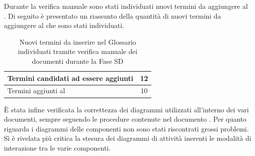 				Durante la verifica manuale sono stati individuati nuovi termini da aggiungere al . Di seguito è presentato un 
				riassunto della quantità di nuovi termini da aggiungere al  che sono stati individuati.
				\begin{table}[H]
					\centering
					\begin{tabu}{| l | c |}
						\hline
						Termini candidati ad essere aggiunti	&	12\\ \hline
						Termini aggiunti al 	& 10\\ \hline
					\end{tabu}
					\caption{Nuovi termini da inserire nel Glossario individuati tramite verifica manuale dei documenti durante la Fase SD}
				\end{table}
				È stata infine verificata la correttezza dei diagrammi  utilizzati all'interno dei vari documenti, sempre seguendo le procedure contenute nel documento . Per quanto riguarda i diagrammi delle componenti non sono stati riscontrati grossi problemi. Sì è rivelata più critica la stesura dei diagrammi di attività inerenti le modalità di interazione tra le varie componenti.
				
